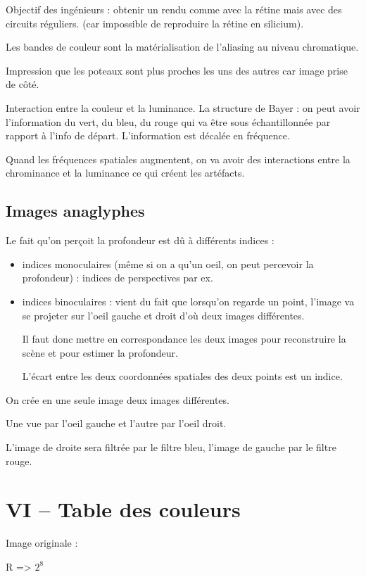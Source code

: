 \documentclass{report}
\begin{document}
Objectif des ingénieurs : obtenir un rendu comme avec la rétine mais avec des circuits réguliers. (car impossible de reproduire la rétine en silicium).

Les bandes de couleur sont la matérialisation de l'aliasing au niveau chromatique.

Impression que les poteaux sont plus proches les uns des autres car image prise de côté.

Interaction entre la couleur et la luminance. La structure de Bayer : on peut avoir l'information du vert, du bleu, du rouge qui va être sous échantillonnée par rapport à l'info de départ. L'information est décalée en fréquence. 

Quand les fréquences spatiales augmentent, on va avoir des interactions entre la chrominance et la luminance ce qui créent les artéfacts.

\subsection*{Images anaglyphes}

Le fait qu'on perçoit la profondeur est dû à différents indices :
	\begin{itemize}
	\item indices monoculaires (même si on a qu'un oeil, on peut percevoir la profondeur) : indices de perspectives par ex.
	\item indices binoculaires : vient du fait que lorsqu'on regarde un point, l'image va se projeter sur l'oeil gauche et droit d'où deux images différentes.

Il faut donc mettre en correspondance les deux images pour reconstruire la scène et pour estimer la profondeur. 

L'écart entre les deux coordonnées spatiales des deux points est un indice.
	\end{itemize}

On crée en une seule image deux images différentes. 

Une vue par l'oeil gauche et l'autre par l'oeil droit. 

L'image de droite sera filtrée par le filtre bleu, l'image de gauche par le filtre rouge.


\section*{VI – Table des couleurs}

Image originale : 

R => $2^{8}$
\end{document}
